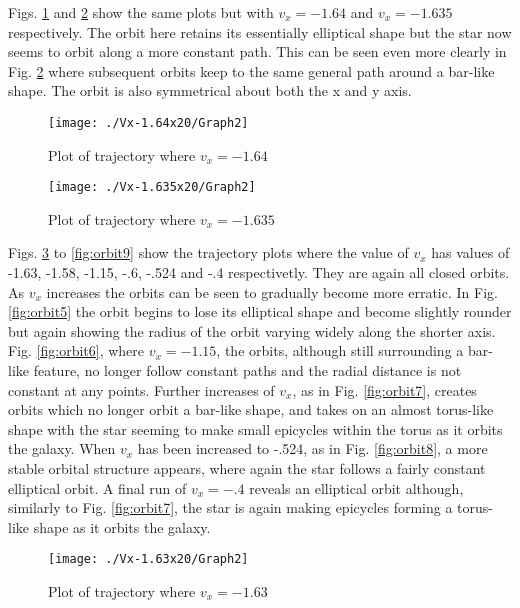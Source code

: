 \documentclass[a4paper,12pt]{article}
\begin{document}
Figs. \ref{fig:orbit2} and \ref{fig:orbit3} show the same plots but with $v_x=-1.64$ and $v_x=-1.635$ respectively. The orbit here retains its essentially elliptical shape but the star now seems to orbit along a more constant path. This can be seen even more clearly in Fig. \ref{fig:orbit3} where subsequent orbits keep to the same general path around a bar-like shape. The orbit is also symmetrical about both the x and y axis.

\begin{figure}[H]
\centering
\texttt{[image: ./Vx-1.64x20/Graph2]}
\caption{Plot of trajectory where $v_x=-1.64$}
\label{fig:orbit2}
\end{figure}

\begin{figure}[H]
\centering
\texttt{[image: ./Vx-1.635x20/Graph2]}
\caption{Plot of trajectory where $v_x=-1.635$}
\label{fig:orbit3}
\end{figure}

Figs. \ref{fig:orbit4} to \ref{fig:orbit9} show the trajectory plots where the value of $v_x$ has values of -1.63, -1.58, -1.15, -.6, -.524 and -.4 respectivetly. They are again all closed orbits. As $v_x$ increases the orbits can be seen to gradually become more erratic. In Fig. \ref{fig:orbit5} the orbit begins to lose its elliptical shape and become slightly rounder but again showing the radius of the orbit varying widely along the shorter axis. Fig. \ref{fig:orbit6}, where $v_x=-1.15$, the orbits, although still surrounding a bar-like feature, no longer follow constant paths and the radial distance is not constant at any points. Further increases of $v_x$, as in Fig. \ref{fig:orbit7}, creates orbits which no longer orbit a bar-like shape, and takes on an almost torus-like shape with the star seeming to make small epicycles within the torus as it orbits the galaxy. When $v_x$ has been increased to -.524, as in Fig. \ref{fig:orbit8}, a more stable orbital structure appears, where again the star follows a fairly constant elliptical orbit. A final run of $v_x=-.4$ reveals an elliptical orbit although, similarly to Fig. \ref{fig:orbit7}, the star is again making epicycles forming a torus-like shape as it orbits the galaxy.

\begin{figure}[H]
\centering
\texttt{[image: ./Vx-1.63x20/Graph2]}
\caption{Plot of trajectory where $v_x=-1.63$}
\label{fig:orbit4}
\end{figure}
\end{document}

